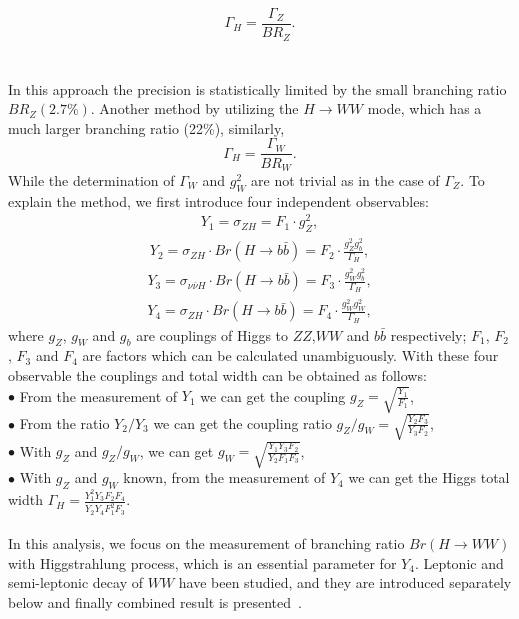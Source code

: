 \documentclass[11pt,a4paper]{cepcnote}
\begin{document}
\begin{equation}
\Gamma_H = \frac{\Gamma_Z}{BR_Z}.
\end{equation}
\\
\\
In this approach the precision is statistically limited by the small branching ratio $BR_Z(2.7\%)$. Another method by utilizing the $H \rightarrow WW$ mode, which has a much larger branching ratio (22\%), similarly,
\begin{equation}
\Gamma_H = \frac{\Gamma_W}{BR_W}.
\end{equation}
While the determination of $\Gamma_W$ and $g_W^2$ are not trivial as in the case of $\Gamma_Z$.
To explain the method, we first introduce four independent observables:
\begin{eqnarray}
Y_1 = \sigma_{ZH} = F_1\cdot g_Z^2 ,
\end{eqnarray}
\begin{eqnarray}
Y_2 = \sigma_{ZH} \cdot Br(H \rightarrow b\bar{b}) = F_2 \cdot \frac{g_Z^2g_b^2}{\Gamma_H},
\end{eqnarray}
\begin{eqnarray}
Y_3 = \sigma_{\nu\bar{\nu}H} \cdot Br(H \rightarrow b\bar{b}) = F_3 \cdot \frac{g_W^2g_b^2}{\Gamma_H},
\end{eqnarray}
\begin{eqnarray}
Y_4 = \sigma_{ZH} \cdot Br(H \rightarrow b\bar{b}) = F_4 \cdot \frac{g_W^2g_W^2}{\Gamma_H},
\end{eqnarray}
where $g_Z$, $g_W$ and $g_b$ are couplings of Higgs to $ZZ$,$ WW$ and $b\bar{b}$ respectively;
$F_1$, $F_2$, $F_3$ and $F_4$ are factors which can be calculated unambiguously. With these
four observable the couplings and total width can be obtained as follows:\\
$\bullet$ From the measurement of $Y_1$ we can get the coupling $g_Z = \sqrt{\frac{Y_1}{F_1}}$,\\
$\bullet$ From the ratio $Y_2/Y_3$ we can get the coupling ratio $g_Z/g_W = \sqrt{\frac
{Y_2F_3}{Y_3F_2}}$,\\
$\bullet$ With $g_Z$ and $g_Z/g_W$, we can get $g_W = \sqrt{\frac{Y_1Y_3F_2}{Y_2F_1F_3}}$,\\
$\bullet$ With $g_Z$ and $g_W$ known, from the measurement of $Y_4$ we can get the Higgs 
total width $\Gamma_H = \frac{Y_1^2Y_3F_2F_4}{Y_2Y_4F_1^2F_3}$.\\
\\
In this analysis, we focus on the measurement of branching ratio $Br(H \rightarrow WW)$ with
Higgstrahlung process, which is an essential parameter for $Y_4$. Leptonic and semi-leptonic 
decay of $WW$ have been studied, and they are introduced separately below and finally combined 
result is presented~\cite{wwnote}.\\
\end{document}
